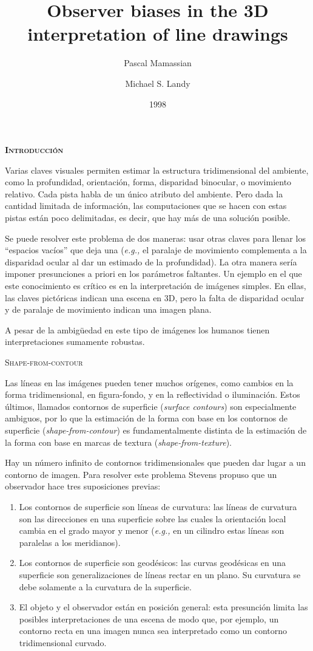 \documentclass[a4paper,12pt]{article}
\title{Observer biases in the 3D interpretation of line drawings}
\author{Pascal Mamassian \and Michael S. Landy}
\date{1998}
\begin{document}
{\scshape\bfseries \maketitle}

{\scshape\bfseries Introducción}

Varias claves visuales permiten estimar la estructura tridimensional del ambiente, como la profundidad, orientación, forma, disparidad binocular, o movimiento relativo. Cada pista habla de un único atributo del ambiente. Pero dada la cantidad limitada de información, las computaciones que se hacen con estas pistas están poco delimitadas, es decir, que hay más de una solución posible. 

Se puede resolver este problema de dos maneras: usar otras claves para llenar los ``espacios vacíos'' que deja una ({\itshape e.g.,} el paralaje de movimiento complementa a la disparidad ocular al dar un estimado de la profundidad). La otra manera sería imponer presunciones a priori en los parámetros faltantes. Un ejemplo en el que este conocimiento es crítico es en la interpretación de imágenes simples. En ellas, las claves pictóricas indican una escena en 3D, pero la falta de disparidad ocular y de paralaje de movimiento indican una imagen plana.

A pesar de la ambigüedad en este tipo de imágenes los humanos tienen interpretaciones sumamente robustas.

{\scshape Shape-from-contour}

Las líneas en las imágenes pueden tener muchos orígenes, como cambios en la forma tridimensional, en figura-fondo, y en la reflectividad o iluminación. Estos últimos, llamados contornos de superficie ({\itshape surface contours}) son especialmente ambiguos, por lo que la estimación de la forma con base en los contornos de superficie ({\itshape shape-from-contour}) es fundamentalmente distinta de la estimación de la forma con base en marcas de textura ({\itshape shape-from-texture}).

Hay un número infinito de contornos tridimensionales que pueden dar lugar a un contorno de imagen. Para resolver este problema Stevens propuso que un observador hace tres suposiciones previas: 

\begin{enumerate}
	\item Los contornos de superficie son líneas de curvatura: las líneas de curvatura son las direcciones en una superficie sobre las cuales la orientación local cambia en el grado mayor y menor ({\itshape e.g.,} en un cilindro estas líneas son paralelas a los meridianos).
	\item Los contornos de superficie son geodésicos: las curvas geodésicas en una superficie son generalizaciones de líneas rectar en un plano. Su curvatura se debe solamente a la curvatura de la superficie.
	\item El objeto y el observador están en posición general: esta presunción limita las posibles interpretaciones de una escena de modo que, por ejemplo, un contorno recta en una imagen nunca sea interpretado como un contorno tridimensional curvado.
\end{enumerate}
\end{document}
